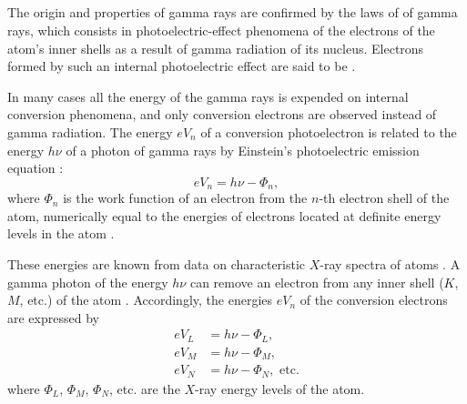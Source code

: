 \subsection{}\label{42.7.3} The origin and properties of gamma rays are confirmed by the laws of  of gamma rays, which consists in photoelectric-effect phenomena  of the electrons of the atom's inner shells as a result of gamma radiation of its nucleus. Electrons formed by such an internal photoelectric effect are said to be .

In many cases all the energy of the gamma rays is expended on internal conversion phenomena, and only conversion electrons are observed instead of gamma radiation. The energy $eV_{n}$ of a conversion photoelectron is related to the energy $h\nu$ of a photon of gamma rays by Einstein's photoelectric emission equation :
\begin{equation*}%
eV_{n} = h\nu - \Phi_{n},
\end{equation*}
where $\Phi_{n}$ is the work function of an electron from the $n$-th electron shell of the atom, numerically equal to the energies of electrons located at definite energy levels in the atom .

These energies are known from data on characteristic $X$-ray
spectra of atoms . A gamma photon of the energy $h\nu$ can remove an electron from any inner shell ($K$, $M$, etc.) of the atom . Accordingly, the energies $eV_{n}$ of the conversion electrons are expressed by
\begin{align*}%
eV_{L} & = h\nu - \Phi_{L},\\
eV_{M} & = h\nu - \Phi_{M},\\
eV_{N} & = h\nu - \Phi_{N}, \text{ etc.}
\end{align*}
where $\Phi_{L}$, $\Phi_{M}$, $\Phi_{N}$, etc. are the $X$-ray energy levels of the atom.


